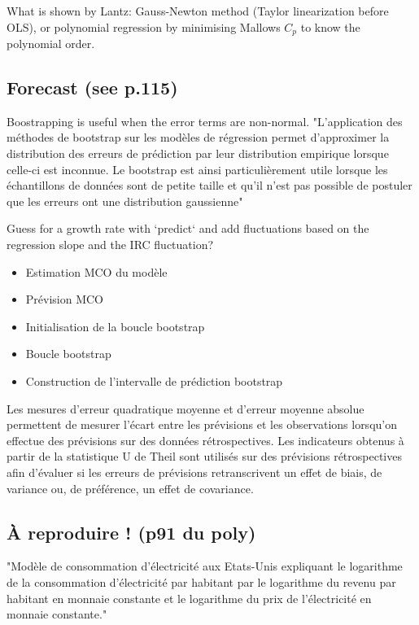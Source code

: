 What is shown by Lantz: Gauss-Newton method (Taylor linearization before OLS), or polynomial regression by minimising Mallows $C_p$ to know the polynomial order. 

\subsection{Forecast (see p.115)}
Boostrapping is useful when the error terms are non-normal. "L’application des méthodes de bootstrap sur les modèles de régression permet d’approximer la distribution des erreurs de prédiction par leur distribution empirique lorsque celle-ci est inconnue. Le bootstrap est ainsi particulièrement utile lorsque les
échantillons de données sont de petite taille et qu’il n’est pas possible de postuler que les erreurs ont une distribution gaussienne"

Guess for a growth rate with `predict` and add fluctuations based on the regression slope and the IRC fluctuation? \\

\begin{itemize}
    \item Estimation MCO du modèle
    \item Prévision MCO
    \item Initialisation de la boucle bootstrap
    \item Boucle bootstrap
    \item Construction de l’intervalle de prédiction bootstrap
\end{itemize}

Les mesures d’erreur quadratique moyenne et d’erreur moyenne absolue permettent de mesurer l’écart entre les prévisions et les observations lorsqu’on effectue
des prévisions sur des données rétrospectives. Les indicateurs obtenus à partir de la statistique U de Theil sont utilisés sur des prévisions rétrospectives afin d’évaluer si les erreurs de prévisions retranscrivent un effet de biais, de variance ou, de préférence, un
effet de covariance.

\subsection{À reproduire ! (p91 du poly)}
"Modèle de consommation d’électricité aux Etats-Unis expliquant le logarithme de la consommation d’électricité par habitant par le logarithme du revenu par habitant en monnaie constante et le logarithme du prix de l’électricité en monnaie constante." \\

